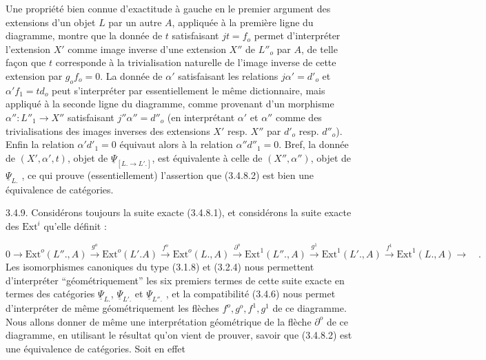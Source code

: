 Une propriété bien connue d'exactitude à gauche en le premier argument des extensions d'un objet $L$ par un autre $A$, appliquée à la première ligne du diagramme, montre que la donnée de $t$ satisfaisant $jt = f_o$ permet d'interpréter l'extension $X'$ comme image inverse d'une extension $X''$ de $L''_o$ par $A$, de telle façon que $t$ corresponde à la trivialisation naturelle de l'image inverse de cette extension par $g_o f_o = 0$. La donnée de $\alpha'$ satisfaisant les relations $j\alpha' = d'_o$ et $\alpha'f_1 = td_o$ peut s'interpréter par essentiellement le même dictionnaire, mais appliqué à la seconde ligne du diagramme, comme provenant d'un morphisme $\alpha'' : L''_1 \longrightarrow X''$ satisfaisant $j''\alpha'' = d''_o$ (en interprétant $\alpha'$ et $\alpha''$ comme des trivialisations des images inverses des extensions $X'$ resp. $X''$ par $d'_o$ resp. $d''_o$). Enfin la relation $\alpha'd'_1 = 0$ équivaut alors à la relation $\alpha''d''_1 = 0$. Bref, la donnée de $(X',\alpha',t)$, objet de $\underline{\Psi}_{[L. \longrightarrow L'.]}$, est équivalente à celle de $(X'',\alpha'')$, objet de $\underline{\Psi}_{L.}$ , ce qui prouve (essentiellement) l'assertion que (3.4.8.2) est bien une équivalence de catégories.

3.4.9. Considérons toujours la suite exacte (3.4.8.1), et considérons la suite exacte des $\mathrm{Ext}^i$ qu'elle définit :

{\footnotesize \begin{equation}\tag{3.4.9.1}
0 \longrightarrow \mathrm{Ext}^o(L''.,A) \stackrel{g^o}{\longrightarrow} \mathrm{Ext}^o(L'.A) \stackrel{f^o}{\longrightarrow} \mathrm{Ext}^o(L.,A) \stackrel{\partial^o}{\longrightarrow} \mathrm{Ext}^1(L''.,A) \stackrel{g^1}{\longrightarrow} \mathrm{Ext}^1(L'.,A) \stackrel{f^1}{\longrightarrow} \mathrm{Ext}^1(L.,A) \longrightarrow \quad .
\end{equation}}
Les isomorphismes canoniques du type (3.1.8) et (3.2.4) nous permettent d'interpréter ``géométriquement'' les six premiers termes de cette suite exacte en termes des catégories $\underline{\Psi}_{L.}$, $\underline{\Psi}_{L'.}$ et $\underline{\Psi}_{L''.}$ , et la compatibilité (3.4.6) nous permet d'interpréter de même géométriquement les flèches
$f^o,g^o,f^1,g^1$ de ce diagramme. Nous allons donner de même une interprétation géométrique de la flèche $\partial^o$ de ce diagramme, en utilisant le résultat qu'on vient de prouver, savoir que (3.4.8.2) est une équivalence de catégories. Soit en effet

